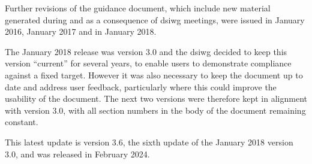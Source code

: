 Further revisions of the guidance document, which include new material generated during and as a consequence of \gls{dsiwg} meetings, were issued in January 2016, January 2017 and in January 2018.

The January 2018 release was version 3.0 and the \gls{dsiwg} decided to keep this version ``current'' for several years, to enable users to demonstrate compliance against a fixed target. However it was also necessary to keep the document up to date and address user feedback, particularly where this could improve the usability of the document. The next two versions were therefore kept in alignment with version 3.0, with all section numbers in the body of the document remaining constant.

This latest update is version 3.6, the sixth update of the January 2018 version 3.0, and was released in February 2024.
